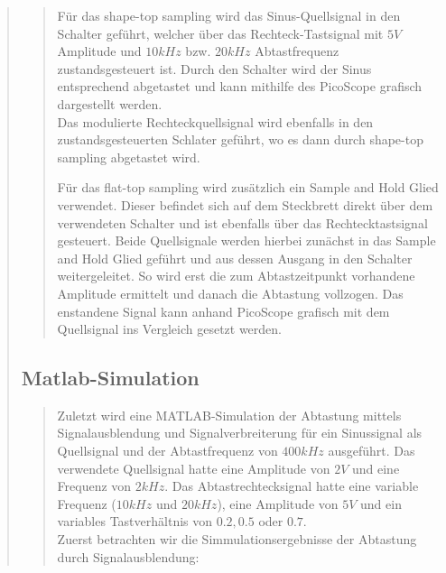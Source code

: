 \begin{quote}
\begin{quote}
        Für das shape-top sampling wird das Sinus-Quellsignal in den
        Schalter geführt, welcher über das Rechteck-Tastsignal mit $5V$ Amplitude und $10 kHz$ bzw. $20 kHz$
        Abtastfrequenz zustandsgesteuert ist. Durch den Schalter wird der Sinus
        entsprechend abgetastet und kann mithilfe des PicoScope grafisch
        dargestellt werden.\\ 
        Das modulierte Rechteckquellsignal wird ebenfalls in den
        zustandsgesteuerten Schlater geführt, wo es dann durch shape-top sampling
        abgetastet wird. 
        
        \vspace{0.5em}
        
        Für das flat-top sampling wird zusätzlich ein Sample and Hold Glied
        verwendet. Dieser befindet sich auf dem Steckbrett direkt über dem
        verwendeten Schalter und ist ebenfalls über das Rechtecktastsignal
        gesteuert. Beide Quellsignale werden hierbei zunächst in das Sample and
        Hold Glied geführt und aus dessen Ausgang in den Schalter
        weitergeleitet. So wird erst die zum Abtastzeitpunkt vorhandene
        Amplitude ermittelt und danach die Abtastung vollzogen. Das enstandene
        Signal kann anhand PicoScope grafisch mit dem Quellsignal ins Vergleich gesetzt
        werden.
        
    \end{quote}  %
    
    \subsection{Matlab-Simulation}
    \begin{quote}
    
        Zuletzt wird eine MATLAB-Simulation der Abtastung mittels Signalausblendung
        und Signalverbreiterung für ein Sinussignal als Quellsignal und der
        Abtastfrequenz von $400 kHz$ ausgeführt. Das verwendete Quellsignal
        hatte eine Amplitude von $2V$ und eine Frequenz von $2 kHz$. Das
        Abtastrechtecksignal hatte eine variable Frequenz ($10 kHz$ und $20 kHz$),
        eine Amplitude von $5V$ und ein
        variables Tastverhältnis von $0.2, 0.5$ oder $0.7$.\\
        
        Zuerst betrachten wir die Simmulationsergebnisse der Abtastung durch
        Signalausblendung:
        

\end{quote}
\end{quote}
